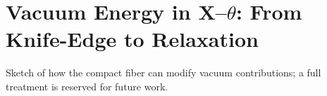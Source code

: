 \section{Vacuum Energy in X--$\theta$: From Knife-Edge to Relaxation}\label{sec:vacuum-energy}
Sketch of how the compact fiber can modify vacuum contributions; a full treatment is reserved for future work.

